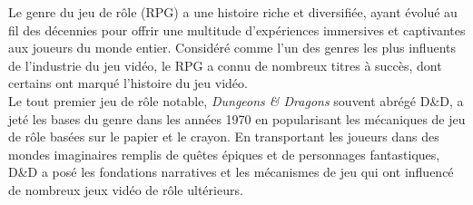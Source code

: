 Le genre du jeu de rôle (RPG) a une histoire riche et diversifiée, ayant évolué au fil des décennies pour offrir une multitude d'expériences immersives et captivantes aux joueurs du monde entier. 
Considéré comme l'un des genres les plus influents de l'industrie du jeu vidéo, le RPG a connu de nombreux titres à succès, dont certains ont marqué l'histoire du jeu vidéo.
\\

Le tout premier jeu de rôle notable, \textit{Dungeons \& Dragons} souvent abrégé D\&D, a jeté les bases du genre dans les années 1970 en popularisant les mécaniques de jeu de rôle basées sur le papier et le crayon.
En transportant les joueurs dans des mondes imaginaires remplis de quêtes épiques et de personnages fantastiques, D\&D a posé les fondations narratives et les mécanismes de jeu qui ont influencé de nombreux jeux vidéo de rôle ultérieurs.
\\




    


